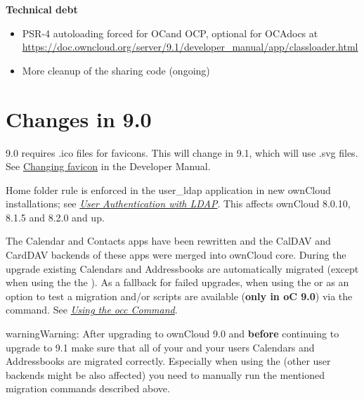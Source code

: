 \documentclass[letterpaper,10pt,english]{sphinxmanual}
\begin{document}
\textbf{Technical debt}
\begin{itemize}
\item {} 
PSR-4 autoloading forced for OCand OCP, optional for OCAdocs at \href{https://doc.owncloud.org/server/9.1/developer\_manual/app/classloader.html}{https://doc.owncloud.org/server/9.1/developer\_manual/app/classloader.html}

\item {} 
More cleanup of the sharing code (ongoing)

\end{itemize}


\section{Changes in 9.0}
\label{release_notes:release-notes-label}\label{release_notes:changes-in-9-0}
9.0 requires .ico files for favicons. This will change in 9.1, which will
use .svg files. See \href{https://doc.owncloud.org/server/9.0/developer\_manual/core/theming.html\#changing-favicon}{Changing favicon} in the Developer Manual.

Home folder rule is enforced in the user\_ldap application in new ownCloud installations; see
{\hyperref[configuration_user/user_auth_ldap::doc]{\emph{User Authentication with LDAP}}}. This affects ownCloud 8.0.10, 8.1.5 and 8.2.0 and up.

The Calendar and Contacts apps have been rewritten and the CalDAV and CardDAV backends of these
apps were merged into ownCloud core. During the upgrade existing Calendars and Addressbooks
are automatically migrated (except when using the the ). As a fallback
for failed upgrades, when using the  or as an option to test a migration
 and/or  scripts are available
(\textbf{only in oC 9.0}) via the  command. See {\hyperref[configuration_server/occ_command::doc]{\emph{Using the occ Command}}}.

\begin{notice}{warning}{Warning:}
After upgrading to ownCloud 9.0 and \textbf{before} continuing to upgrade to 9.1 make sure
that all of your and your users Calendars and Addressbooks are migrated correctly. Especially
when using the  (other user backends might be also affected) you need to
manually run the mentioned  migration commands described above.
\end{notice}
\end{document}
